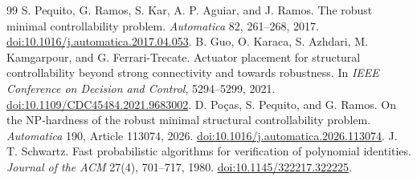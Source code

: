 \documentclass[11pt]{article}
\theoremstyle{definition}
\theoremstyle{remark}\newtheorem{remark}[theorem]{Remark}
\begin{document}
\begin{thebibliography}{99}
 S. Pequito, G. Ramos, S. Kar, A. P. Aguiar, and J. Ramos.
The robust minimal controllability problem.
\emph{Automatica} 82, 261--268, 2017.
\href{https://doi.org/10.1016/j.automatica.2017.04.053}{doi:10.1016/j.automatica.2017.04.053}.
 B. Guo, O. Karaca, S. Azhdari, M. Kamgarpour,
and G. Ferrari-Trecate.
Actuator placement for structural controllability beyond strong
connectivity and towards robustness.
In \emph{IEEE Conference on Decision and Control}, 5294--5299, 2021.
\href{https://doi.org/10.1109/CDC45484.2021.9683002}{doi:10.1109/CDC45484.2021.9683002}.
 D. Po\c{c}as, S. Pequito, and G. Ramos.
On the NP-hardness of the robust minimal structural controllability problem.
\emph{Automatica} 190, Article 113074, 2026.
\href{https://doi.org/10.1016/j.automatica.2026.113074}{doi:10.1016/j.automatica.2026.113074}.
 J. T. Schwartz.
Fast probabilistic algorithms for verification of polynomial identities.
\emph{Journal of the ACM} 27(4), 701--717, 1980.
\href{https://doi.org/10.1145/322217.322225}{doi:10.1145/322217.322225}.
\end{thebibliography}
\end{document}
